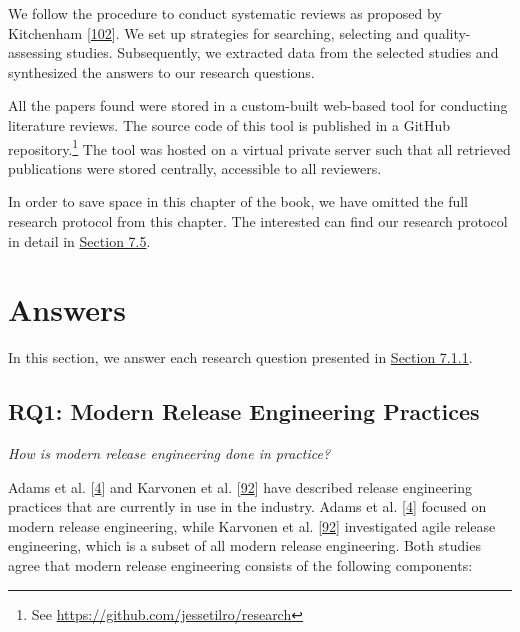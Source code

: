 \documentclass[]{book}
\let\rmarkdownfootnote\footnote%
\def\footnote{\protect\rmarkdownfootnote}
\begin{document}
We follow the procedure to conduct systematic reviews as proposed by
Kitchenham {[}\protect\hyperlink{ref-kitchenham2004procedures}{102}{]}.
We set up strategies for searching, selecting and quality-assessing
studies. Subsequently, we extracted data from the selected studies and
synthesized the answers to our research questions.

All the papers found were stored in a custom-built web-based tool for
conducting literature reviews. The source code of this tool is published
in a GitHub repository.\footnote{See
  \url{https://github.com/jessetilro/research}} The tool was hosted on a
virtual private server such that all retrieved publications were stored
centrally, accessible to all reviewers.

In order to save space in this chapter of the book, we have omitted the
full research protocol from this chapter. The interested can find our
research protocol in detail in \protect\hyperlink{appendix}{Section
7.5}.

\section{Answers}\label{answers-3}

In this section, we answer each research question presented in
\protect\hyperlink{research-questions-1}{Section 7.1.1}.

\subsection{RQ1: Modern Release Engineering
Practices}\label{rq1-modern-release-engineering-practices}

\emph{How is modern release engineering done in practice?}

Adams et al. {[}\protect\hyperlink{ref-adams2016a}{4}{]} and Karvonen et
al. {[}\protect\hyperlink{ref-karvonen2017a}{92}{]} have described
release engineering practices that are currently in use in the industry.
Adams et al. {[}\protect\hyperlink{ref-adams2016a}{4}{]} focused on
modern release engineering, while Karvonen et al.
{[}\protect\hyperlink{ref-karvonen2017a}{92}{]} investigated agile
release engineering, which is a subset of all modern release
engineering. Both studies agree that modern release engineering consists
of the following components:
\end{document}
